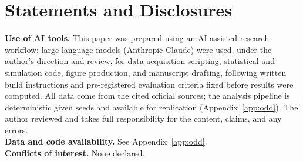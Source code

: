 \documentclass[11pt]{article}
\begin{document}
\section*{Statements and Disclosures}
\noindent\textbf{Use of AI tools.} This paper was prepared using an AI-assisted
research workflow: large language models (Anthropic Claude) were used, under
the author's direction and review, for data acquisition scripting, statistical
and simulation code, figure production, and manuscript drafting, following
written build instructions and pre-registered evaluation criteria fixed before
results were computed. All data come from the cited official sources; the
analysis pipeline is deterministic given seeds and available for replication
(Appendix~\ref{app:odd}). The author reviewed and takes full responsibility
for the content, claims, and any errors.\\[0.4em]
\noindent\textbf{Data and code availability.} See Appendix~\ref{app:odd}.\\[0.4em]
\noindent\textbf{Conflicts of interest.} None declared.




\appendix

\end{document}
